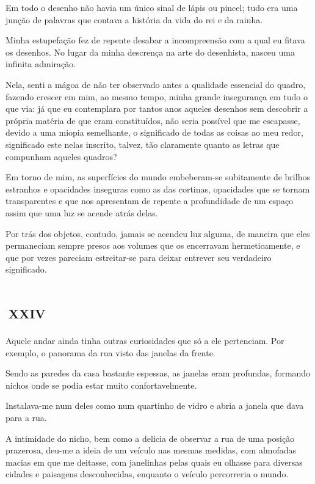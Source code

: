 Em todo o desenho não havia um único sinal de lápis ou pincel; tudo era uma junção de palavras que contava a história da vida do rei e da rainha.

Minha estupefação fez de repente desabar a incompreensão com a qual eu fitava os desenhos. No lugar da minha descrença na arte do desenhista, nasceu uma infinita admiração.

Nela, senti a mágoa de não ter observado antes a qualidade essencial do quadro, fazendo crescer em mim, ao mesmo tempo, minha grande insegurança em tudo o que via: já que eu contemplara por tantos anos aqueles desenhos sem descobrir a própria matéria de que eram constituídos, não seria possível que me escapasse, devido a uma miopia semelhante, o significado de todas as coisas ao meu redor, significado este nelas inscrito, talvez, tão claramente quanto as letras que compunham aqueles quadros?

Em torno de mim, as superfícies do mundo embeberam-se subitamente de brilhos estranhos e opacidades inseguras como as das cortinas, opacidades que se tornam transparentes e que nos apresentam de repente a profundidade de um espaço assim que uma luz se acende atrás delas.

Por trás dos objetos, contudo, jamais se acendeu luz alguma, de maneira que eles permaneciam sempre presos aos volumes que os encerravam hermeticamente, e que por vezes pareciam estreitar-se para deixar entrever seu verdadeiro significado.


\chapter*{\small{}\,\Large\centering\textsc{xxiv}\,\small{}}

Aquele andar ainda tinha outras curiosidades que só a ele pertenciam. Por exemplo, o panorama da rua visto das janelas da frente.

Sendo as paredes da casa bastante espessas, as janelas eram profundas, formando nichos onde se podia estar muito confortavelmente.

Instalava-me num deles como num quartinho de vidro e abria a janela que dava para a rua. 

A intimidade do nicho, bem como a delícia de observar a rua de uma posição prazerosa, deu-me a ideia de um veículo nas mesmas medidas, com almofadas macias em que me deitasse, com janelinhas pelas quais eu olhasse para diversas cidades e paisagens desconhecidas, enquanto o veículo percorreria o mundo.

